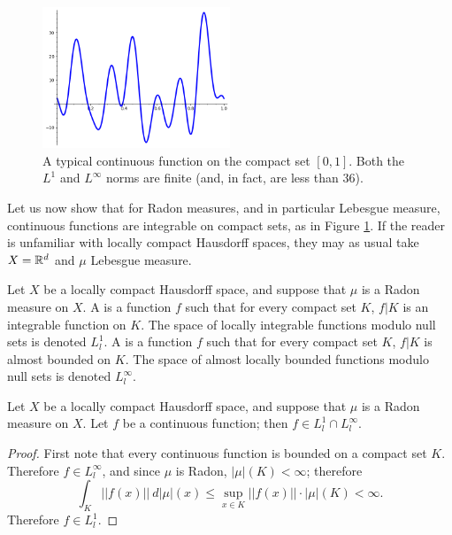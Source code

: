 \begin{figure}
\label{continuous function figure}
\caption{A typical continuous function on the compact set $[0, 1]$. Both the $L^1$ and $L^\infty$ norms are finite (and, in fact, are less than $36$).}
\centering \includegraphics[width=0.5\textwidth]{graphics/typical_continuous}
\end{figure}

\begin{subsec}
Let us now show that for Radon measures, and in particular Lebesgue measure, continuous functions are integrable on compact sets, as in Figure \ref{continuous function figure}.
If the reader is unfamiliar with locally compact Hausdorff spaces, they may as usual take $X = \mathbb{R}^{d}$ and $\mu$ Lebesgue measure.
\end{subsec}

\begin{definition}
Let $X$ be a locally compact Hausdorff space, and suppose that $\mu$ is a Radon measure on $X$.
A  is a function $f$ such that for every compact set $K$, $f|K$ is an integrable function on $K$.
The space of locally integrable functions modulo null sets is denoted $L^{1}_{l}$.
A  is a function $f$ such that for every compact set $K$, $f|K$ is almost bounded on $K$.
The space of almost locally bounded functions modulo null sets is denoted $L^{\infty}_{l}$.
\end{definition}

\begin{lemma}
Let $X$ be a locally compact Hausdorff space, and suppose that $\mu$ is a Radon measure on $X$.
Let $f$ be a continuous function; then $f \in L^{1}_{l} \cap L^{\infty}_{l}$.
\end{lemma}
\begin{proof}
First note that every continuous function is bounded on a compact set $K$.
Therefore $f \in L^{\infty}_{l}$, and since $\mu$ is Radon, $|\mu|(K) < \infty$; therefore
\[\int_{K} ||f(x)||~d|\mu|(x) \leq \sup_{x \in K} ||f(x)||\cdot |\mu|(K) < \infty.\]
Therefore $f \in L^{1}_{l}$.
\end{proof}

